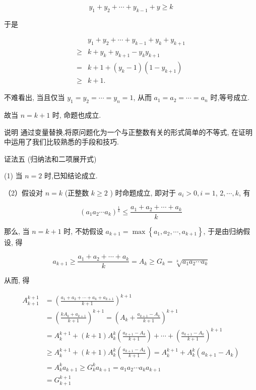 $$
y_{1}+y_{2}+\cdots+y_{k-1}+y \geqslant k
$$

于是

$$
\begin{aligned}
& y_{1}+y_{2}+\cdots+y_{k-1}+y_{k}+y_{k+1} \\
\geqslant & k+y_{k}+y_{k+1}-y_{k} y_{k+1} \\
= & k+1+\left(y_{k}-1\right)\left(1-y_{k+1}\right) \\
\geqslant & k+1 .
\end{aligned}
$$

不难看出, 当且仅当 $y_{1}=y_{2}=\cdots=y_{n}=1$, 从而 $a_{1}=a_{2}=\cdots=a_{n}$ 时,等号成立.

故当 $n=k+1$ 时, 命题也成立.

说明 通过变量替换,将原问题化为一个与正整数有关的形式简单的不等式, 在证明中运用了我们比较熟悉的手段和技巧.

证法五 (归纳法和二项展开式)

(1) 当 $n=2$ 时,已知结论成立.

（2）假设对 $n=k$ (正整数 $k \geqslant 2$ ) 时命题成立, 即对于 $a_{i}>0, i=1$, $2, \cdots, k$, 有

$$
\left(a_{1} a_{2} \cdots a_{k}\right)^{\frac{1}{k}} \leqslant \frac{a_{1}+a_{2}+\cdots+a_{k}}{k}
$$

那么, 当 $n=k+1$ 时, 不妨假设 $a_{k+1}=\max \left\{a_{1}, a_{2}, \cdots, a_{k+1}\right\}$, 于是由归纳假设, 得

$$
a_{k+1} \geqslant \frac{a_{1}+a_{2}+\cdots+a_{k}}{k}=A_{k} \geqslant G_{k}=\sqrt[k]{a_{1} a_{2} \cdots a_{k}}
$$

从而, 得


\begin{align*}
A_{k+1}^{k+1} & =\left(\frac{a_{1}+a_{2}+\cdots+a_{k}+a_{k+1}}{k+1}\right)^{k+1} \\
& =\left(\frac{k A_{k}+a_{k+1}}{k+1}\right)^{k+1}=\left(A_{k}+\frac{a_{k+1}-A_{k}}{k+1}\right)^{k+1}  \tag{8}\\
& =A_{k}^{k+1}+(k+1) A_{k}^{k}\left(\frac{a_{k+1}-A_{k}}{k+1}\right)+\cdots+\left(\frac{a_{k+1}-A_{k}}{k+1}\right)^{k+1}  \tag{9}\\
& \geqslant A_{k}^{k+1}+(k+1) A_{k}^{k}\left(\frac{a_{k+1}-A_{k}}{k+1}\right)=A_{k}^{k+1}+A_{k}^{k}\left(a_{k+1}-A_{k}\right)  \tag{1}\\
& =A_{k}^{k} a_{k+1} \geqslant G_{k}^{k} a_{k+1}=a_{1} a_{2} \cdots a_{k} a_{k+1}  \tag{1}\\
& =G_{k+1}^{k+1} \tag{12}
\end{align*}


